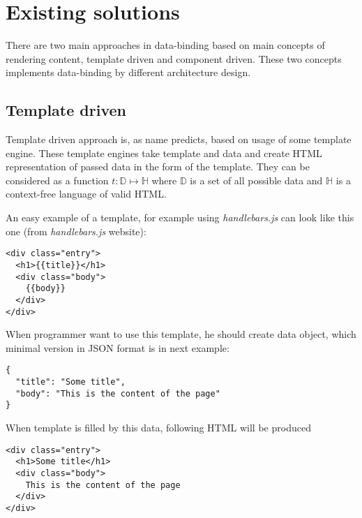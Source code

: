 \documentclass[oneside, 12pt]{book}
\begin{document}
\chapter{Existing solutions}\label{chap:existing}

There are two main approaches in data-binding based on main concepts of rendering content, template driven and component driven.
These two concepts implements data-binding by different architecture design. 

\section{Template driven}\label{sec:existing-template}

	Template driven approach is, as name predicts, based on usage of some template engine. 
	These template engines take template and data and create HTML representation of passed data in the form of the template. 
	They can be considered as a function $t:\mathbb D\mapsto\mathbb H$ where $\mathbb D$ is a set of all possible data and $\mathbb H$ is a context-free language of valid HTML.

	An easy example of a template, for example using \textit{handlebars.js} can look like this one (from \textit{handlebars.js} website):
\begin{verbatim}
<div class="entry">
  <h1>{{title}}</h1>
  <div class="body">
    {{body}}
  </div>
</div>
\end{verbatim}



	When programmer want to use this template, he should create data object, which minimal version in JSON format is in next example:
\begin{verbatim}
{
  "title": "Some title",
  "body": "This is the content of the page"
}
\end{verbatim}



	When template is filled by this data, following HTML will be produced
\begin{verbatim}
<div class="entry">
  <h1>Some title</h1>
  <div class="body">
    This is the content of the page
  </div>
</div>
\end{verbatim}
\end{document}
